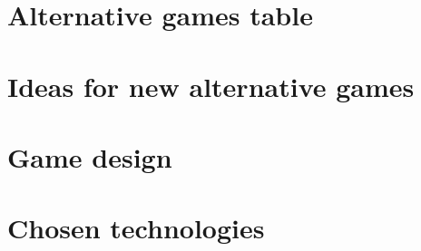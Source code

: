\documentclass[../Main.tex]{subfiles}
\begin{document}
\section{Alternative games table}
\section{Ideas for new alternative games}
\section{Game design}
\section{Chosen technologies}

\biblio %
\end{document}
